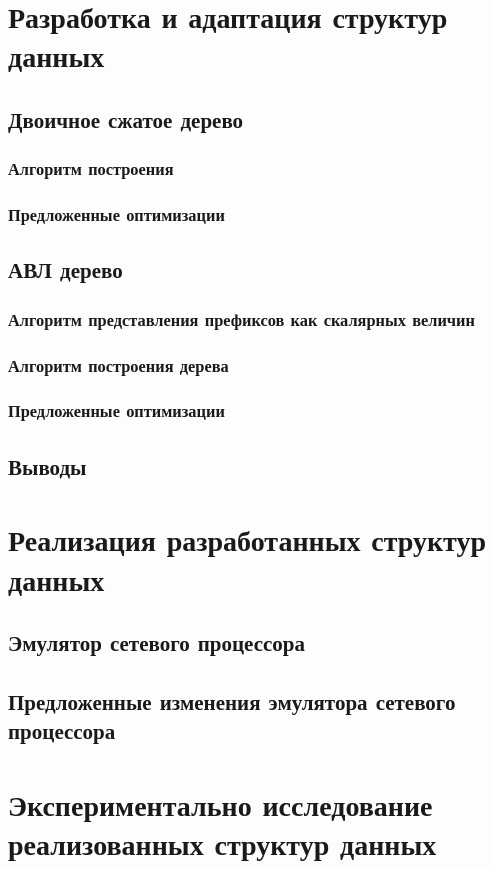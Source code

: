 \documentclass[a4peper, 12pt, titlepage, finall]{report}
\begin{document}
        \chapter{Разработка и адаптация структур данных}
            \section{Двоичное сжатое дерево}
                \subsection{Алгоритм построения}
                \subsection{Предложенные оптимизации}
            \section{АВЛ дерево}
                \subsection{Алгоритм представления префиксов как скалярных величин}
                \subsection{Алгоритм построения дерева}
                \subsection{Предложенные оптимизации}
            \section{Выводы}
        \chapter{Реализация разработанных структур данных}
            \section{Эмулятор сетевого процессора}
            \section{Предложенные изменения эмулятора сетевого процессора}
        \chapter{Экспериментально исследование реализованных структур данных}
\end{document}
